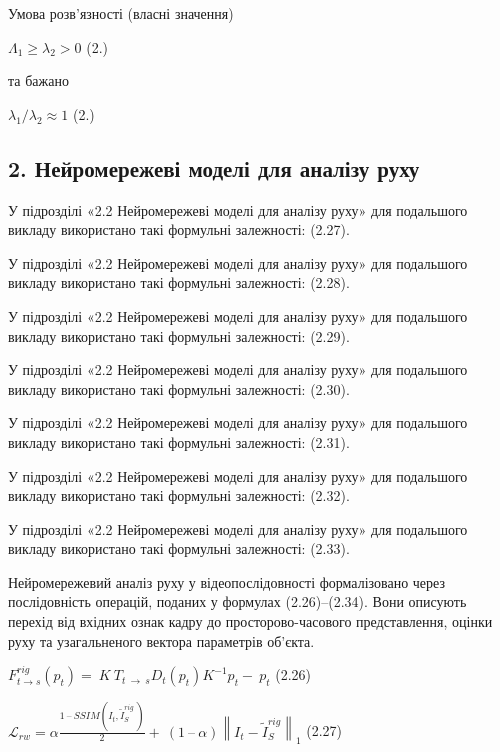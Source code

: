 \documentclass[
]{article}
\begin{document}
Умова розв'язності (власні значення)

\(\Lambda_{1} \geq \lambda_{2} > 0\) (2.)

та бажано

\(\lambda_{1}\text{/}\lambda_{2} \approx 1\) (2.)

\subsection{2. Нейромережеві моделі для аналізу руху}\label{ux43dux435ux439ux440ux43eux43cux435ux440ux435ux436ux435ux432ux456-ux43cux43eux434ux435ux43bux456-ux434ux43bux44f-ux430ux43dux430ux43bux456ux437ux443-ux440ux443ux445ux443}

У підрозділі «2.2 Нейромережеві моделі для аналізу руху» для подальшого викладу використано такі формульні залежності: (2.27).

У підрозділі «2.2 Нейромережеві моделі для аналізу руху» для подальшого викладу використано такі формульні залежності: (2.28).

У підрозділі «2.2 Нейромережеві моделі для аналізу руху» для подальшого викладу використано такі формульні залежності: (2.29).

У підрозділі «2.2 Нейромережеві моделі для аналізу руху» для подальшого викладу використано такі формульні залежності: (2.30).

У підрозділі «2.2 Нейромережеві моделі для аналізу руху» для подальшого викладу використано такі формульні залежності: (2.31).

У підрозділі «2.2 Нейромережеві моделі для аналізу руху» для подальшого викладу використано такі формульні залежності: (2.32).

У підрозділі «2.2 Нейромережеві моделі для аналізу руху» для подальшого викладу використано такі формульні залежності: (2.33).

Нейромережевий аналіз руху у відеопослідовності формалізовано через послідовність операцій, поданих у формулах (2.26)--(2.34). Вони описують перехід від вхідних ознак кадру до просторово-часового представлення, оцінки руху та узагальненого вектора параметрів об'єкта.

\(F_{t \rightarrow s}^{rig}\left( p_{t} \right) = \ K\ T_{t\  \rightarrow \ s}D_{t}\left( p_{t} \right)K^{- 1}p_{t} - \ p_{t}\) (2.26)

\(\mathcal{L}_{rw} = \alpha\frac{1\ –\ SSIM\left( I_{t},{\widetilde{I}}_{S}^{rig}\  \right)}{2} + \ (1\ –\ \alpha)\left\| I_{t} - {\widetilde{I}}_{S}^{rig} \right\|_{1}\) (2.27)
\end{document}
